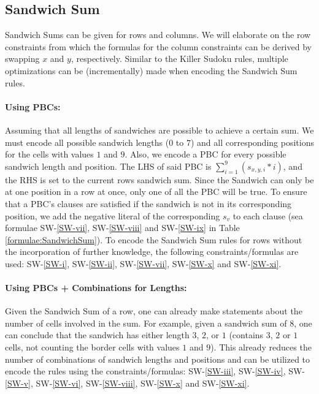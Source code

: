\FloatBarrier
\newpage
\subsection{Sandwich Sum}
Sandwich Sums can be given for rows and columns. We will elaborate on the row constraints from which the formulas for the column constraints can be derived by swapping $x$ and $y$, respectively. Similar to the Killer Sudoku rules, multiple optimizations can be (incrementally) made when encoding the Sandwich Sum rules.

\paragraph{Using PBCs:} Assuming that all lengths of sandwiches are possible to achieve a certain sum. We must encode all possible sandwich lengths ($0$ to $7$) and all corresponding positions for the cells with values $1$ and $9$. Also, we encode a PBC for every possible sandwich length and position. The LHS of said PBC is $\sum_{i=1}^{9} (s_{x,y,i}*i)$, and the RHS is set to the current rows sandwich sum. Since the Sandwich can only be at one position in a row at once, only one of all the PBC will be true. To ensure that a PBC's clauses are satisfied if the sandwich is not in its corresponding position, we add the negative literal of the corresponding $s_v$ to each clause (sea formulae SW-\ref{SW-vii}, SW-\ref{SW-viii} and SW-\ref{SW-ix} in Table \ref{formulae:SandwichSum}). To encode the Sandwich Sum rules for rows without the incorporation of further knowledge, the following constraints/formulas are used: SW-\ref{SW-i}, SW-\ref{SW-ii}, SW-\ref{SW-vii}, SW-\ref{SW-x} and SW-\ref{SW-xi}.

\paragraph{Using PBCs + Combinations for Lengths:} Given the Sandwich Sum of a row, one can already make statements about the number of cells involved in the sum. For example, given a sandwich sum of $8$, one can conclude that the sandwich has either length $3$, $2$, or $1$ (contains $3$, $2$ or $1$ cells, not counting the border cells with values $1$ and $9$). This already reduces the number of combinations of sandwich lengths and positions and can be utilized to encode the rules using the constraints/formulas: SW-\ref{SW-iii}, SW-\ref{SW-iv}, SW-\ref{SW-v}, SW-\ref{SW-vi}, SW-\ref{SW-viii}, SW-\ref{SW-x} and SW-\ref{SW-xi}.

